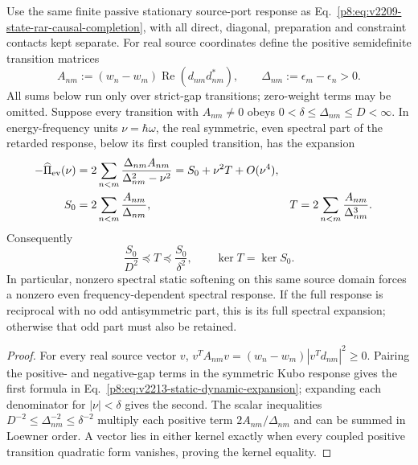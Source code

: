\documentclass[12pt,a4paper]{article}
\begin{document}
\begin{proposition}
\label{p8:prop:v2213-static-dynamic-gap}
Use the same finite passive stationary source-port response as
Eq.~\eqref{p8:eq:v2209-state-rar-causal-completion}, with all direct,
diagonal, preparation and constraint contacts kept separate. For real
source coordinates define the positive semidefinite transition matrices
\[
 A_{nm}:=(w_n-w_m)\operatorname{Re}(d_{nm}d_{nm}^*),
 \qquad \Delta_{nm}:=\epsilon_m-\epsilon_n>0.
\]
All sums below run only over strict-gap transitions; zero-weight terms may
be omitted. Suppose every transition with $A_{nm}\ne0$ obeys
$0<\delta\le\Delta_{nm}\le D<\infty$. In energy-frequency units
$\nu=\hbar\omega$, the real symmetric, even spectral part of the retarded
response, below its first coupled transition, has the expansion
\begin{equation}
\label{p8:eq:v2213-static-dynamic-expansion}
 \begin{aligned}
 -\widehat\Pi_{\rm ev}(\nu)
   &=2\sum_{n<m}\frac{\Delta_{nm}A_{nm}}
                              {\Delta_{nm}^2-\nu^2}
     =S_0+\nu^2T+O(\nu^4),\\
 S_0&=2\sum_{n<m}\frac{A_{nm}}{\Delta_{nm}},
 & T&=2\sum_{n<m}\frac{A_{nm}}{\Delta_{nm}^3}.
 \end{aligned}
\end{equation}
Consequently
\begin{equation}
\label{p8:eq:v2213-static-dynamic-gap}
 \boxed{\frac{S_0}{D^2}\preceq T\preceq\frac{S_0}{\delta^2},
 \qquad \ker T=\ker S_0.}
\end{equation}
In particular, nonzero spectral static softening on this same source domain
forces a nonzero even frequency-dependent spectral response. If the full
response is reciprocal with no odd antisymmetric part, this is its full
spectral expansion; otherwise that odd part must also be retained.
\end{proposition}
\begin{proof}
For every real source vector $v$,
$v^TA_{nm}v=(w_n-w_m)|v^Td_{nm}|^2\ge0$.
Pairing the positive- and negative-gap terms in the symmetric Kubo response
gives the first formula in
Eq.~\eqref{p8:eq:v2213-static-dynamic-expansion}; expanding each denominator
for $|\nu|<\delta$ gives the second. The scalar inequalities
$D^{-2}\le\Delta_{nm}^{-2}\le\delta^{-2}$ multiply each positive term
$2A_{nm}/\Delta_{nm}$ and can be summed in Loewner order.
A vector lies in either kernel exactly when every coupled positive
transition quadratic form vanishes, proving the kernel equality.
\end{proof}
\end{document}
